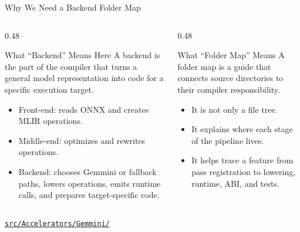 \documentclass[aspectratio=169,10pt]{beamer}
\newcommand{\repoRoot}{/home/lahcen/toolchains/onnx-mlir-xcompile/onnx-mlir}
\newcommand{\pathcode}[1]{\href{run:\repoRoot/#1}{\texttt{\scriptsize #1}}}
\begin{document}
\begin{frame}{Why We Need a Backend Folder Map}
  \begin{columns}
    \begin{column}{0.48\textwidth}
      \begin{block}{What ``Backend'' Means Here}
        A backend is the part of the compiler that turns a general model representation into code for a specific execution target.
      \end{block}
      \begin{itemize}
        \item Front-end: reads ONNX and creates MLIR operations.
        \item Middle-end: optimizes and rewrites operations.
        \item Backend: chooses Gemmini or fallback paths, lowers operations, emits runtime calls, and prepares target-specific code.
      \end{itemize}
    \end{column}
    \begin{column}{0.48\textwidth}
      \begin{block}{What ``Folder Map'' Means}
        A folder map is a guide that connects source directories to their compiler responsibility.
      \end{block}
      \begin{itemize}
        \item It is not only a file tree.
        \item It explains where each stage of the pipeline lives.
        \item It helps trace a feature from pass registration to lowering, runtime, ABI, and tests.
      \end{itemize}
    \end{column}
  \end{columns}
  \vspace{0.5em}
  \pathcode{src/Accelerators/Gemmini/}
\end{frame}
\end{document}
